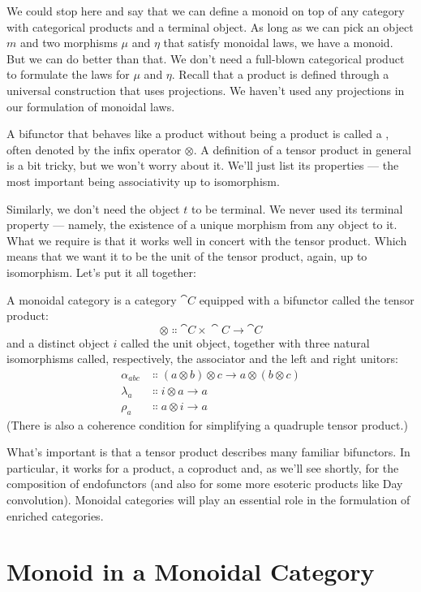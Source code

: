 We could stop here and say that we can define a monoid on top of any
category with categorical products and a terminal object. As long as we
can pick an object $m$ and two morphisms $\mu$ and $\eta$ that satisfy
monoidal laws, we have a monoid. But we can do better than that. We
don't need a full-blown categorical product to formulate the laws for $\mu$
and $\eta$. Recall that a product is defined through a universal construction
that uses projections. We haven't used any projections in our
formulation of monoidal laws.

A bifunctor that behaves like a product without being a product is
called a , often denoted by the infix operator $\otimes$. A
definition of a tensor product in general is a bit tricky, but we won't
worry about it. We'll just list its properties --- the most important
being associativity up to isomorphism.

Similarly, we don't need the object $t$ to be terminal. We never
used its terminal property --- namely, the existence of a unique
morphism from any object to it. What we require is that it works well in
concert with the tensor product. Which means that we want it to be the
unit of the tensor product, again, up to isomorphism. Let's put it all
together:

A monoidal category is a category $\cat{C}$ equipped with a bifunctor
called the tensor product:
\[\otimes \Colon \cat{C}\times{}\cat{C} \to \cat{C}\]
and a distinct object $i$ called the unit object, together with
three natural isomorphisms called, respectively, the associator and the
left and right unitors:
\begin{align*}
\alpha_{a b c} &\Colon (a \otimes b) \otimes c \to a \otimes (b \otimes c) \\
\lambda_a &\Colon i \otimes a \to a \\
\rho_a &\Colon a \otimes i \to a
\end{align*}
(There is also a coherence condition for simplifying a quadruple tensor
product.)

What's important is that a tensor product describes many familiar
bifunctors. In particular, it works for a product, a coproduct and, as
we'll see shortly, for the composition of endofunctors (and also for
some more esoteric products like Day convolution). Monoidal categories
will play an essential role in the formulation of enriched categories.

\section{Monoid in a Monoidal Category}

